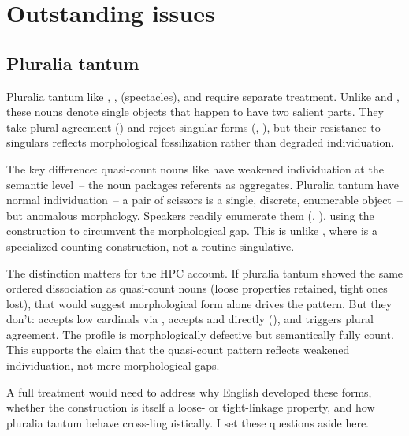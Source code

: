 \documentclass[12pt,a4paper]{article}
\begin{document}
\section{Outstanding issues}\label{sec:outstanding}

\subsection{Pluralia tantum}

Pluralia tantum like , ,  (spectacles), and  require separate treatment. Unlike  and , these nouns denote single objects that happen to have two salient parts. They take plural agreement () and reject singular forms (, ), but their resistance to singulars reflects morphological fossilization rather than degraded individuation.

The key difference: quasi-count nouns like  have weakened individuation at the semantic level~-- the noun packages referents as aggregates. Pluralia tantum have normal individuation~-- a pair of scissors is a single, discrete, enumerable object~-- but anomalous morphology. Speakers readily enumerate them (, ), using the  construction to circumvent the morphological gap. This is unlike , where  is a specialized counting construction, not a routine singulative.

The distinction matters for the HPC account. If pluralia tantum showed the same ordered dissociation as quasi-count nouns (loose properties retained, tight ones lost), that would suggest morphological form alone drives the pattern. But they don't:  accepts low cardinals via , accepts  and  directly (), and triggers plural agreement. The profile is morphologically defective but semantically fully count. This supports the claim that the quasi-count pattern reflects weakened individuation, not mere morphological gaps.

A full treatment would need to address why English developed these forms, whether the  construction is itself a loose- or tight-linkage property, and how pluralia tantum behave cross-linguistically. I set these questions aside here.
\end{document}
